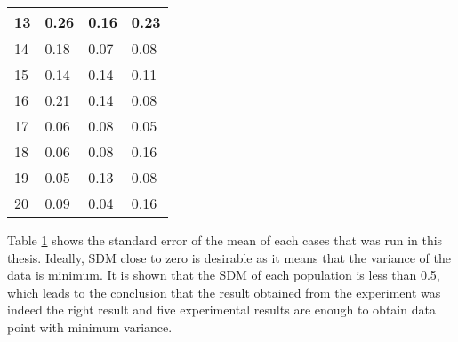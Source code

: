 \begin{table}[H]
\begin{tabular}{|l|l|l|l|}
\hline
13                  & \textcolor[rgb]{0.2,0.2,0.2}{0.26} & 0.16    & 0.23                                           \\ 
\hline
14                  & \textcolor[rgb]{0.2,0.2,0.2}{0.18} & 0.07    & 0.08                                           \\ 
\hline
15                  & \textcolor[rgb]{0.2,0.2,0.2}{0.14} & 0.14    & 0.11                                           \\ 
\hline
16                  & \textcolor[rgb]{0.2,0.2,0.2}{0.21} & 0.14    & 0.08                                           \\ 
\hline
17                  & \textcolor[rgb]{0.2,0.2,0.2}{0.06} & 0.08    & 0.05                                           \\ 
\hline
18                  & \textcolor[rgb]{0.2,0.2,0.2}{0.06} & 0.08    & 0.16                                           \\ 
\hline
19                  & \textcolor[rgb]{0.2,0.2,0.2}{0.05} & 0.13    & 0.08                                           \\ 
\hline
20                  & \textcolor[rgb]{0.2,0.2,0.2}{0.09} & 0.04    & 0.16                                           \\
\hline
\end{tabular}
\label{tab:stddevofmean}
\end{table}
Table \ref{tab:stddevofmean} shows the standard error of the mean of each cases that was run in this thesis. Ideally, SDM close to zero is desirable as it means that the variance of the data is minimum. It is shown that the SDM of each population is less than 0.5, which leads to the conclusion that the result obtained from the experiment was indeed the right result and five experimental results are enough to obtain data point with minimum variance.\par
